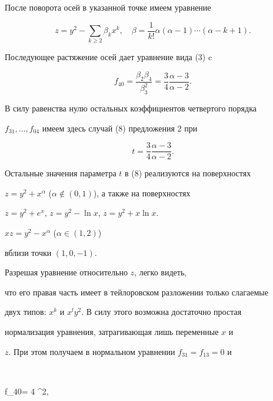 После поворота осей в указанной точке имеем уравнение


$$


z=y^2 - \sum_{k \ge 2} \beta_k x^k , \quad \beta=


\frac1{k!} \alpha(\alpha -1) \dotsb (\alpha - k+1).


$$


Последующее растяжение осей дает уравнение вида (3) c


$$


f_{40}=\frac{\beta_2 \beta_4}{\beta_3^2}=


\frac34 \frac {\alpha - 3}{\alpha -2}.


$$


В силу равенства нулю остальных коэффициентов четвертого порядка


$ f_{31},\dotsc,f_{04}$ имеем здесь случай (8) предложения 2 при


$$


t=\frac34 \frac {\alpha - 3}{\alpha -2}.


$$


Остальные значения параметра $t$ в (8) реализуются на поверхностях


$z=y^2+x^{\alpha}$ ($\alpha \notin (0,1)$), а также на поверхностях


$z=y^2+e^x$, $z=y^2 - \ln x$, $z=y^2+x \ln x$.





\begin{exam}


$x z=y^2 - x^{\alpha}$ ($\alpha \in (1,2)$)


вблизи точки $(1, 0, -1)$.


\end{exam}





Разрешая уравнение относительно $z$, легко видеть,


что его правая часть имеет в тейлоровском разложении только слагаемые


двух типов: $x^k$ и $x^l y^2$. В силу этого возможна достаточно простая


нормализация уравнения, затрагивающая лишь переменные $x$ и


$z$. При этом получаем в нормальном уравнении $f_{31}=f_{13}=0$ и


$$


f_{40}= {4 \alpha ^2}, \quad


